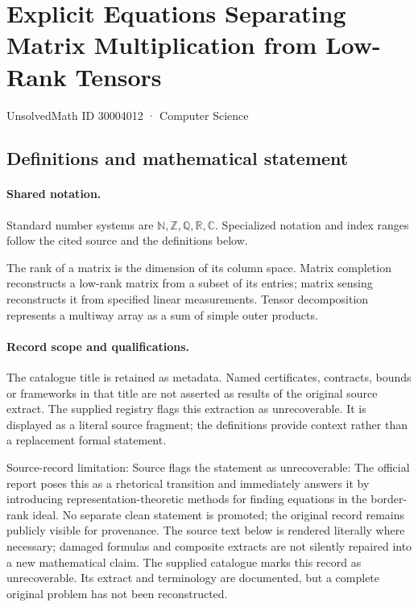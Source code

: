 \documentclass[11pt]{article}
\begin{document}
\setcounter{section}{30004011}
\section{Explicit Equations Separating Matrix Multiplication from Low-Rank Tensors}\label{30004012}
{\small\sffamily UnsolvedMath ID 30004012 · Computer Science}
\subsection{Definitions and mathematical statement}

\paragraph{Shared notation.}Standard number systems are $\mathbb N,\mathbb Z,\mathbb Q,\mathbb R,\mathbb C$. Specialized notation and index ranges follow the cited source and the definitions below.


The rank of a matrix is the dimension of its column space. Matrix completion reconstructs a low-rank matrix from a subset of its entries; matrix sensing reconstructs it from specified linear measurements. Tensor decomposition represents a multiway array as a sum of simple outer products.
\paragraph{Record scope and qualifications.}
The catalogue title is retained as metadata. Named certificates, contracts, bounds or frameworks in that title are not asserted as results of the original source extract.
The supplied registry flags this extraction as unrecoverable. It is displayed as a literal source fragment; the definitions provide context rather than a replacement formal statement.

Source-record limitation: Source flags the statement as unrecoverable: The official report poses this as a rhetorical transition and immediately answers it by introducing representation-theoretic methods for finding equations in the border-rank ideal. No separate clean statement is promoted; the original record remains publicly visible for provenance.
The source text below is rendered literally where necessary; damaged formulas and composite extracts are not silently repaired into a new mathematical claim.
The supplied catalogue marks this record as unrecoverable. Its extract and terminology are documented, but a complete original problem has not been reconstructed.
\end{document}
